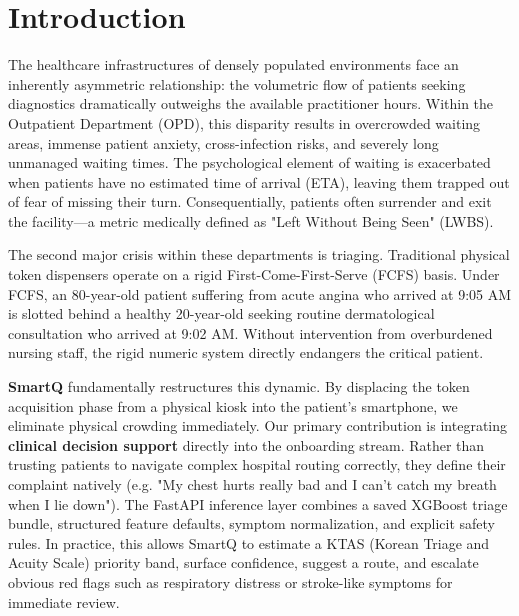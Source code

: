\documentclass[12pt,a4paper]{article}
\begin{document}
\section{Introduction}

The healthcare infrastructures of densely populated environments face an inherently asymmetric relationship: the volumetric flow of patients seeking diagnostics dramatically outweighs the available practitioner hours. Within the Outpatient Department (OPD), this disparity results in overcrowded waiting areas, immense patient anxiety, cross-infection risks, and severely long unmanaged waiting times. The psychological element of waiting is exacerbated when patients have no estimated time of arrival (ETA), leaving them trapped out of fear of missing their turn. Consequentially, patients often surrender and exit the facility—a metric medically defined as "Left Without Being Seen" (LWBS).

The second major crisis within these departments is triaging. Traditional physical token dispensers operate on a rigid First-Come-First-Serve (FCFS) basis. Under FCFS, an 80-year-old patient suffering from acute angina who arrived at 9:05 AM is slotted behind a healthy 20-year-old seeking routine dermatological consultation who arrived at 9:02 AM. Without intervention from overburdened nursing staff, the rigid numeric system directly endangers the critical patient.

\textbf{SmartQ} fundamentally restructures this dynamic. By displacing the token acquisition phase from a physical kiosk into the patient's smartphone, we eliminate physical crowding immediately. Our primary contribution is integrating \textbf{clinical decision support} directly into the onboarding stream. Rather than trusting patients to navigate complex hospital routing correctly, they define their complaint natively (e.g. "My chest hurts really bad and I can't catch my breath when I lie down"). The FastAPI inference layer combines a saved XGBoost triage bundle, structured feature defaults, symptom normalization, and explicit safety rules. In practice, this allows SmartQ to estimate a KTAS (Korean Triage and Acuity Scale) priority band, surface confidence, suggest a route, and escalate obvious red flags such as respiratory distress or stroke-like symptoms for immediate review.
\end{document}

